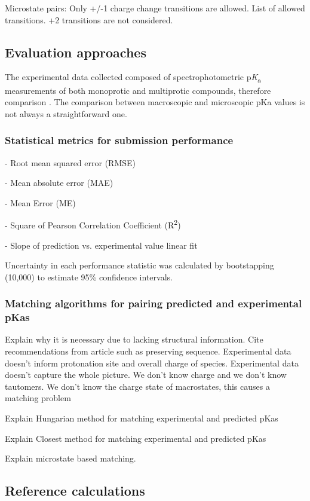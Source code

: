 \documentclass[9pt,lineno,final]{elife}
\newcommand{\pKa}{p\textit{K}\textsubscript{a}}
\begin{document}
Microstate pairs: Only +/-1 charge change transitions are allowed.
List of allowed transitions. +2 transitions are not considered.


\subsection{Evaluation approaches}

The experimental data collected composed of spectrophotometric \pKa{} measurements of both monoprotic and multiprotic compounds, therefore comparison . 
The comparison between macroscopic and microscopic pKa values is not always a straightforward one. 

\subsubsection{Statistical metrics for submission performance}

- Root mean squared error (RMSE)

- Mean absolute error (MAE)

- Mean Error (ME)

- Square of Pearson Correlation Coefficient (R\textsuperscript{2})

- Slope of prediction vs. experimental value linear fit

Uncertainty in each performance statistic was calculated by bootstapping (10,000) to estimate 95\% confidence intervals.

\subsubsection{Matching algorithms for pairing predicted and experimental pKas}

Explain why it is necessary due to lacking structural information. Cite recommendations from article such as preserving sequence.
Experimental data doesn't inform protonation site and overall charge of species.
 Experimental data doesn't capture the whole picture. We don't know charge and we don't know tautomers.
 We don't know the charge state of macrostates, this causes a matching problem


Explain Hungarian method for matching experimental and predicted pKas

Explain Closest method for matching experimental and predicted pKas

Explain microstate based matching.


\subsection{Reference calculations}
\end{document}
